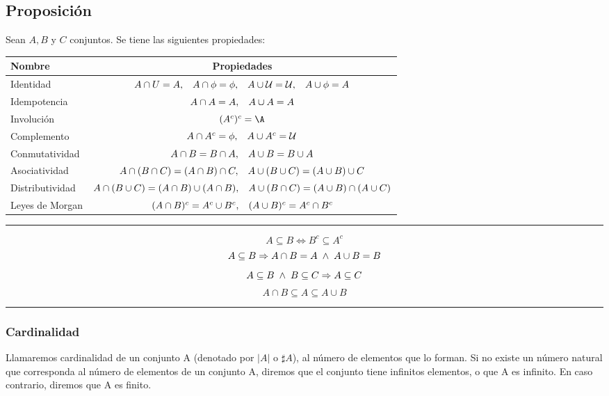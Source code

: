 \subsection{Proposición}
Sean $A, B$ y $C$ conjuntos. Se tiene las siguientes propiedades:
\begingroup
\setlength{\tabcolsep}{5pt} %
\renewcommand{\arraystretch}{1.5} %
\begin{center}
\begin{tabular}{l|c}
\bf Nombre&\bf Propiedades\\ \hline
Identidad&$A \cap U = A,\hspace{0.3cm} A \cap \phi = \phi, \hspace{0.3cm} A \cup \mathcal{U} = \mathcal{U}, \hspace{0.3cm} A \cup \phi = A$\\
Idempotencia&$A \cap A = A, \hspace{0.3cm} A \cup A = A$\\
Involución&$(A^c)^c = \A$\\
Complemento&$A \cap A^c = \phi, \hspace{0.3cm} A \cup A^c = \mathcal{U}$\\
Conmutatividad&$A \cap B = B \cap A, \hspace{0.3cm} A \cup B = B \cup A $\\
Asociatividad&$ A \cap (B \cap C) = (A \cap B) \cap C, \hspace{0.3cm} A \cup (B \cup C) = (A \cup B) \cup C $\\
Distributividad&$A \cap (B \cup C) = (A \cap B) \cup (A \cap B), \hspace{0.3cm} A \cup (B \cap C) = (A \cup B) \cap (A \cup C)$\\
Leyes de Morgan&$(A \cap B)^c = A^c \cup B^c, \hspace{0.3cm} (A \cup B)^c = A^c \cap B^c$
\end{tabular}
\end{center}
\endgroup

\hrule
$$A \subseteq B \Leftrightarrow B^c \subseteq A^c$$
$$A \subseteq B \Rightarrow A \cap B = A  \hspace{0.1cm} \wedge \hspace{0.1cm}  A \cup B =B$$
$$A \subseteq B \hspace{0.1cm} \wedge \hspace{0.1cm} B \subseteq C \Rightarrow A \subseteq C$$
$$A \cap B \subseteq A \subseteq A \cup B$$
\hrule

\subsubsection{Cardinalidad}
Llamaremos cardinalidad de un conjunto A (denotado por $|A|$ o $\sharp A$), al número de elementos que lo forman. Si no existe un número natural que corresponda al número de elementos de un conjunto A, diremos que el conjunto tiene infinitos elementos, o que A es infinito. En caso contrario, diremos que A es finito.

